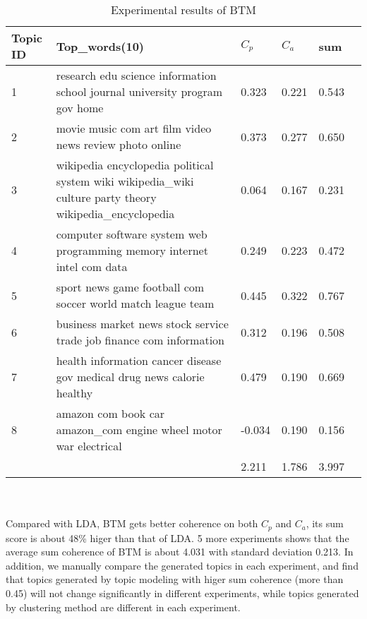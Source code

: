 \begin{table}[!htbp]
    \centering
    \hspace{0.5cm}
    \begin{tabular}{|p{45pt}|p{210pt}|p{30pt}|p{30pt}|p{30pt}|p{30pt}|}
        \hline
        Topic ID & Top\_words(10) & $C_p$ & $C_a$ & sum\\ \hline
        1 & research edu science information school journal university program gov home & 0.323 & 0.221 & 0.543\\\hline
        2 & movie music com art film video news review photo online & 0.373 & 0.277 & 0.650\\\hline
        3 & wikipedia encyclopedia political system wiki wikipedia\_wiki culture party theory wikipedia\_encyclopedia & 0.064 & 0.167 & 0.231\\\hline
        4 & computer software system web programming memory internet intel com data & 0.249 & 0.223 & 0.472\\\hline
        5 & sport news game football com soccer world match league team & 0.445 & 0.322 & 0.767\\\hline
        6 & business market news stock service trade job finance com information & 0.312 & 0.196 & 0.508\\\hline
        7 & health information cancer disease gov medical drug news calorie healthy & 0.479 & 0.190 & 0.669\\\hline
        8 & amazon com book car amazon\_com engine wheel motor war electrical & -0.034 & 0.190 & 0.156\\\hline
        & & 2.211 & 1.786 & 3.997\\\hline
    \end{tabular}
    \caption{Experimental results of BTM}
    \label{tab:BTM1}
\end{table}
\\\\Compared with LDA, BTM gets better coherence on both $C_p$ and $C_a$, its sum score is about 48\% higer than that of LDA. 5 more experiments shows that the average sum coherence of BTM is about 4.031 with standard deviation 0.213. In addition, we manually compare the generated topics in each experiment, and find that topics generated by topic modeling with higer sum coherence (more than 0.45) will not change significantly in different experiments, while topics generated by clustering method are different in each experiment. 

